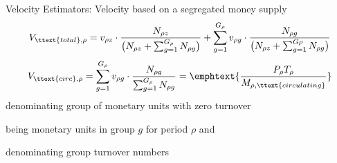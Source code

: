 \documentclass[]{beamer}
\begin{document}

\begin{frame}{Velocity Estimators: Velocity based on a segregated money supply}
  \begin{align*}
    V_{\ttext{total}, \rho} = v_{\rho z} \cdot \frac{N_{\rho z}}{\big( N_{\rho z}+\sum_{g=1}^{G_{\rho}} N_{\rho g} \big)} + \sum_{g=1}^{G_{\rho}} v_{\rho g} \cdot \frac{N_{\rho g}}{\big( N_{\rho z}+\sum_{g=1}^{G\rho} N_{\rho g} \big)}%
  \end{align*}
  \begin{align*}
    V_{\ttext{circ}, \rho} =  \sum_{g=1}^{G_{\rho}} v_{\rho g} \cdot \frac{N_{\rho g}}{\sum_{g=1}^{G_{\rho}} N_{\rho g} } = \emphtext{ \frac{P_{\rho}T_{\rho}}{M_{\rho, \ttext{circulating}}} }%
  \end{align*}
   denominating group of monetary units with zero turnover %

   being  monetary units in group \(g\) for period \(\rho\) and

   denominating group turnover numbers %


\end{frame}









\end{document}
